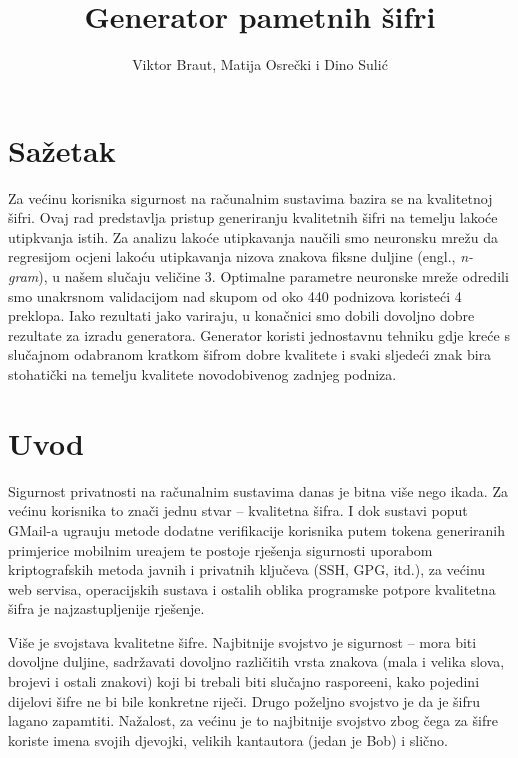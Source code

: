 \documentclass[a4paper,twocolumn]{article}
\begin{document}
\title{Generator pametnih \v{s}ifri}
\author{Viktor Braut, Matija Osre\v{c}ki i Dino Suli\'c}
\maketitle

\section*{Sa\v{z}etak}

Za ve\'cinu korisnika sigurnost na ra\v{c}unalnim sustavima bazira se na
kvalitetnoj \v{s}ifri. Ovaj rad predstavlja pristup generiranju kvalitetnih
\v{s}ifri na temelju lako\'ce utipkvanja istih. Za analizu lako\'ce utipkavanja
nau\v{c}ili smo neuronsku mre\v{z}u da regresijom ocjeni lako\'cu utipkavanja
nizova znakova fiksne duljine (engl., \emph{n-gram}), u na\v{s}em slu\v{c}aju
veli\v{c}ine 3. Optimalne parametre neuronske mre\v{z}e odredili smo unakrsnom
validacijom nad skupom od oko 440 podnizova koriste\'ci 4 preklopa. Iako
rezultati jako variraju, u kona\v{c}nici smo dobili dovoljno dobre rezultate za
izradu generatora. Generator koristi jednostavnu tehniku gdje kre\'ce s
slu\v{c}ajnom odabranom kratkom \v{s}ifrom dobre kvalitete i svaki sljede\'ci znak bira
stohati\v{c}ki na temelju kvalitete novodobivenog zadnjeg podniza.

\section{Uvod}

Sigurnost privatnosti na ra\v{c}unalnim sustavima danas je bitna vi\v{s}e nego
ikada. Za ve\'cinu korisnika to zna\v{c}i jednu stvar -- kvalitetna \v{s}ifra.
I dok sustavi poput GMail-a ugra\dj uju metode dodatne verifikacije korisnika
putem tokena generiranih primjerice mobilnim ure\dj ajem te postoje
rje\v{s}enja sigurnosti uporabom kriptografskih metoda javnih i privatnih
klju\v{c}eva (SSH, GPG, itd.), za ve\'cinu web servisa, operacijskih sustava i
ostalih oblika programske potpore kvalitetna \v{s}ifra je najzastupljenije
rje\v{s}enje. 

Vi\v{s}e je svojstava kvalitetne \v{s}ifre. Najbitnije svojstvo je sigurnost --
mora biti dovoljne duljine, sadr\v{z}avati dovoljno razli\v{c}itih vrsta
znakova (mala i velika slova, brojevi i ostali znakovi) koji bi trebali biti
slu\v{c}ajno raspore\dj eni, kako pojedini dijelovi \v{s}ifre ne bi bile
konkretne rije\v{c}i. Drugo po\v{z}eljno svojstvo je da je \v{s}ifru lagano
zapamtiti. Na\v{z}alost, za ve\'cinu je to najbitnije svojstvo zbog \v{c}ega za
\v{s}ifre koriste imena svojih djevojki, velikih kantautora (jedan je Bob) i
sli\v{c}no.
\end{document}
